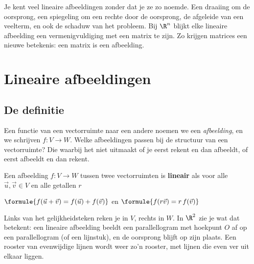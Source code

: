 Je kent veel lineaire afbeeldingen zonder dat je ze zo noemde. Een draaiing om de oorsprong, een spiegeling om een rechte door de oorsprong, de afgeleide van een veelterm, en ook de schaduw van het probleem. Bij $\R^n$ blijkt elke lineaire afbeelding een vermenigvuldiging met een matrix te zijn. Zo krijgen matrices een nieuwe betekenis: een matrix is een afbeelding.

\begin{oefeningen}[Start]

\end{oefeningen}


\section{Lineaire afbeeldingen}

\subsection{De definitie}

Een functie van een vectorruimte naar een andere noemen we een \textit{afbeelding}, en we schrijven $f \colon V \to W$. Welke afbeeldingen passen bij de structuur van een vectorruimte? Die waarbij het niet uitmaakt of je eerst rekent en dan afbeeldt, of eerst afbeeldt en dan rekent.

\begin{theorie}
Een afbeelding $f \colon V \to W$ tussen twee vectorruimten is \textbf{\textcolor{accent}{lineair}} als voor alle $\vec u, \vec v \in V$ en alle getallen $r$

\vspace{1mm}
\qquad $\formule{f(\vec u + \vec v) = f(\vec u) + f(\vec v)}$ \qquad en \qquad $\formule{f(r\vec v) = r\,f(\vec v)}$
\end{theorie}

Links van het gelijkheidsteken reken je in $V$, rechts in $W$. In $\R^2$ zie je wat dat betekent: een lineaire afbeelding beeldt een parallellogram met hoekpunt $O$ af op een parallellogram (of een lijnstuk), en de oorsprong blijft op zijn plaats. Een rooster van evenwijdige lijnen wordt weer zo'n rooster, met lijnen die even ver uit elkaar liggen.

